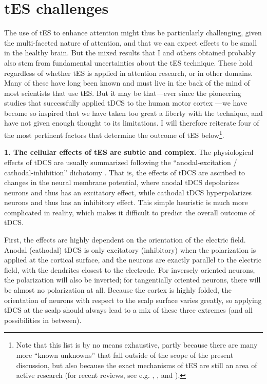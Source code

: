 \documentclass[11pt,english,]{memoir}
\let\rmarkdownfootnote\footnote%
\def\footnote{\protect\rmarkdownfootnote}
\begin{document}
\hypertarget{tes-challenges}{%
\section{tES challenges}\label{tes-challenges}}

The use of tES to enhance attention might thus be particularly challenging, given the multi-faceted nature of attention, and that we can expect effects to be small in the healthy brain. But the mixed results that I and others obtained probably also stem from fundamental uncertainties about the tES technique. These hold regardless of whether tES is applied in attention research, or in other domains. Many of these have long been known \autocites{Bikson2019}{Reato2019} and must live in the back of the mind of most scientists that use tES. But it may be that---ever since the pioneering studies that successfully applied tDCS to the human motor cortex \autocites{Nitsche2000}{Nitsche2001}---we have become so inspired that we have taken too great a liberty with the technique, and have not given enough thought to its limitations. I will therefore reiterate four of the most pertinent factors that determine the outcome of tES below\footnote{Note that this list is by no means exhaustive, partly because there are many more ``known unknowns'' that fall outside of the scope of the present discussion, but also because the exact mechanisms of tES are still an area of active research (for recent reviews, see e.g. \textcite{Fertonani2017}, \textcite{Bestmann2014}, and \textcite{Jackson2016}).}.

\textbf{1. The cellular effects of tES are subtle and complex}. The physiological effects of tDCS are usually summarized following the ``anodal-excitation / cathodal-inhibition'' dichotomy \autocite{Jacobson2012}. That is, the effects of tDCS are ascribed to changes in the neural membrane potential, where anodal tDCS depolarizes neurons and thus has an excitatory effect, while cathodal tDCS hyperpolarizes neurons and thus has an inhibitory effect. This simple heuristic is much more complicated in reality, which makes it difficult to predict the overall outcome of tDCS.

First, the effects are highly dependent on the orientation of the electric field. Anodal (cathodal) tDCS is only excitatory (inhibitory) when the polarization is applied at the cortical surface, and the neurons are exactly parallel to the electric field, with the dendrites closest to the electrode. For inversely oriented neurons, the polarization will also be inverted; for tangentially oriented neurons, there will be almost no polarization at all. Because the cortex is highly folded, the orientation of neurons with respect to the scalp surface varies greatly, so applying tDCS at the scalp should always lead to a mix of these three extremes (and all possibilities in between). \autocite{Reato2019}
\end{document}
